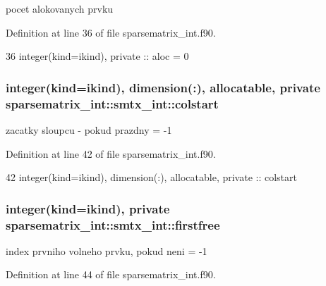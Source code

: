 pocet alokovanych prvku 



Definition at line 36 of file sparsematrix\+\_\+int.\+f90.


\begin{DoxyCode}
36         \textcolor{keywordtype}{integer(kind=ikind)}, \textcolor{keywordtype}{private} :: aloc = 0
\end{DoxyCode}
\subsubsection[{colstart}]{\setlength{\rightskip}{0pt plus 5cm}integer(kind=ikind), dimension(\+:), allocatable, private sparsematrix\+\_\+int\+::smtx\+\_\+int\+::colstart\hspace{0.3cm}{\ttfamily [private]}}\label{structsparsematrix__int_1_1smtx__int_aa638e2ac0381db06c63656b3c1fda4c9}


zacatky sloupcu -\/ pokud prazdny = -\/1 



Definition at line 42 of file sparsematrix\+\_\+int.\+f90.


\begin{DoxyCode}
42         \textcolor{keywordtype}{integer(kind=ikind)}, \textcolor{keywordtype}{dimension(:)}, \textcolor{keywordtype}{allocatable}, \textcolor{keywordtype}{private} :: colstart
\end{DoxyCode}
\subsubsection[{firstfree}]{\setlength{\rightskip}{0pt plus 5cm}integer(kind=ikind), private sparsematrix\+\_\+int\+::smtx\+\_\+int\+::firstfree\hspace{0.3cm}{\ttfamily [private]}}\label{structsparsematrix__int_1_1smtx__int_a42aad0b9571cd6bb0d14eb06fdbe78f6}


index prvniho volneho prvku, pokud neni = -\/1 



Definition at line 44 of file sparsematrix\+\_\+int.\+f90.


